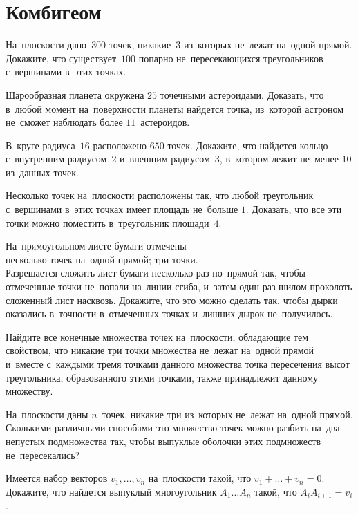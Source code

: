 
\section*{Комбигеом}


\begin{problems}

\item
На~плоскости дано~$300$ точек, никакие~$3$ из~которых не~лежат на~одной прямой.
Докажите, что существует~$100$ попарно не~пересекающихся треугольников
с~вершинами в~этих точках.

\item
Шарообразная планета окружена $25$ точечными астероидами.
Доказать, что в~любой момент на~поверхности планеты найдется точка, из~которой
астроном не~сможет наблюдать более $11$~астероидов.

\item
В~круге радиуса~$16$ расположено $650$ точек.
Докажите, что найдется кольцо с~внутренним радиусом~$2$ и~внешним радиусом~$3$,
в~котором лежит не~менее $10$ из~данных точек.

\item
Несколько точек на~плоскости расположены так, что любой треугольник с~вершинами
в~этих точках имеет площадь не~больше $1$.
Доказать, что все эти точки можно поместить в~треугольник площади~$4$.

\item
На~прямоугольном листе бумаги отмечены
\\
\subproblem несколько точек на~одной прямой;
\qquad
\subproblem три точки.
\\
Разрешается сложить лист бумаги несколько раз по~прямой так, чтобы отмеченные
точки не~попали на~линии сгиба, и~затем один раз шилом проколоть сложенный лист
насквозь.
Докажите, что это можно сделать так, чтобы дырки оказались в~точности
в~отмеченных точках и~лишних дырок не~получилось.

\item
Найдите все конечные множества точек на~плоскости, обладающие тем свойством,
что никакие три точки множества не~лежат на~одной прямой и~вместе с~каждыми
тремя точками данного множества точка пересечения высот треугольника,
образованного этими точками, также принадлежит данному множеству.

\item
На~плоскости даны $n$~точек, никакие три из~которых не~лежат на~одной прямой.
Сколькими различными способами это множество точек можно разбить на~два
непустых подмножества так, чтобы выпуклые оболочки этих подмножеств
не~пересекались?

\item
Имеется набор векторов $v_1, \ldots, v_n$ на~плоскости такой, что
$v_1 + \ldots + v_n = 0$.
Докажите, что найдется выпуклый многоугольник $A_1 \ldots A_n$ такой, что
$\overline{A_i A_{i + 1}} = v_i$.

\end{problems}

